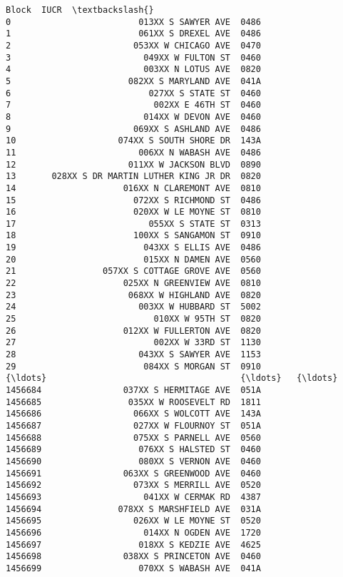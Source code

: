 \documentclass[11pt]{article}
\begin{document}
\begin{Verbatim}[commandchars=\\\{\}]
                                       Block  IUCR  \textbackslash{}
0                         013XX S SAWYER AVE  0486   
1                         061XX S DREXEL AVE  0486   
2                        053XX W CHICAGO AVE  0470   
3                          049XX W FULTON ST  0460   
4                          003XX N LOTUS AVE  0820   
5                       082XX S MARYLAND AVE  041A   
6                           027XX S STATE ST  0460   
7                            002XX E 46TH ST  0460   
8                          014XX W DEVON AVE  0460   
9                        069XX S ASHLAND AVE  0486   
10                    074XX S SOUTH SHORE DR  143A   
11                        006XX N WABASH AVE  0486   
12                      011XX W JACKSON BLVD  0890   
13       028XX S DR MARTIN LUTHER KING JR DR  0820   
14                     016XX N CLAREMONT AVE  0810   
15                       072XX S RICHMOND ST  0486   
16                       020XX W LE MOYNE ST  0810   
17                          055XX S STATE ST  0313   
18                       100XX S SANGAMON ST  0910   
19                         043XX S ELLIS AVE  0486   
20                         015XX N DAMEN AVE  0560   
21                 057XX S COTTAGE GROVE AVE  0560   
22                     025XX N GREENVIEW AVE  0810   
23                      068XX W HIGHLAND AVE  0820   
24                        003XX W HUBBARD ST  5002   
25                           010XX W 95TH ST  0820   
26                     012XX W FULLERTON AVE  0820   
27                           002XX W 33RD ST  1130   
28                        043XX S SAWYER AVE  1153   
29                         084XX S MORGAN ST  0910   
{\ldots}                                      {\ldots}   {\ldots}   
1456684                037XX S HERMITAGE AVE  051A   
1456685                 035XX W ROOSEVELT RD  1811   
1456686                  066XX S WOLCOTT AVE  143A   
1456687                  027XX W FLOURNOY ST  051A   
1456688                  075XX S PARNELL AVE  0560   
1456689                   076XX S HALSTED ST  0460   
1456690                   080XX S VERNON AVE  0460   
1456691                063XX S GREENWOOD AVE  0460   
1456692                  073XX S MERRILL AVE  0520   
1456693                    041XX W CERMAK RD  4387   
1456694               078XX S MARSHFIELD AVE  031A   
1456695                  026XX W LE MOYNE ST  0520   
1456696                    014XX N OGDEN AVE  1720   
1456697                   018XX S KEDZIE AVE  4625   
1456698                038XX S PRINCETON AVE  0460   
1456699                   070XX S WABASH AVE  041A   

\end{Verbatim}
\end{document}
